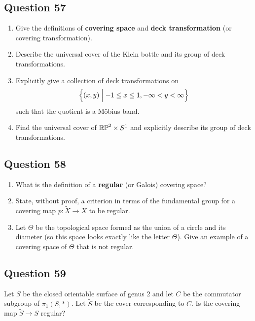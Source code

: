 \documentclass[12pt]{article}
\begin{document}
\hypertarget{question-57-3}{%
\subsection{Question 57}\label{question-57-3}}

\begin{enumerate}
\def\labelenumi{\alph{enumi}.}
\item
  Give the definitions of \textbf{covering space} and \textbf{deck
  transformation} (or covering transformation).
\item
  Describe the universal cover of the Klein bottle and its group of deck
  transformations.
\item
  Explicitly give a collection of deck transformations on
  \[\left\{{(x, y) \mathrel{\Big|} -1 \leq x \leq 1, -\infty < y < \infty}\right\}\] such
  that the quotient is a Möbius band.
\item
  Find the universal cover of \({\mathbb{RP}}^2 \times S^1\) and explicitly
  describe its group of deck transformations.
\end{enumerate}

\hypertarget{question-58-3}{%
\subsection{Question 58}\label{question-58-3}}

\begin{enumerate}
\def\labelenumi{\alph{enumi}.}
\item
  What is the definition of a \textbf{regular} (or Galois) covering
  space?
\item
  State, without proof, a criterion in terms of the fundamental group
  for a covering map \(p : \tilde X \to X\) to be regular.
\item
  Let \(\Theta\) be the topological space formed as the union of a
  circle and its diameter (so this space looks exactly like the letter
  \(\Theta\)). Give an example of a covering space of \(\Theta\) that is
  not regular.
\end{enumerate}

\hypertarget{question-59-3}{%
\subsection{Question 59}\label{question-59-3}}

Let \(S\) be the closed orientable surface of genus 2 and let \(C\) be
the commutator subgroup of \(\pi_1 (S, \ast)\). Let \(\tilde S\) be the
cover corresponding to \(C\). Is the covering map \(\tilde S \to S\)
regular?
\end{document}
